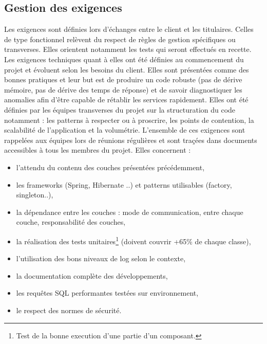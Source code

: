 \documentclass[12pt,a4paper]{article}
\begin{document}
\subsection{Gestion des exigences}
Les exigences sont définies lors d'échanges entre le client et les titulaires. Celles de type fonctionnel relèvent du respect de règles de gestion spécifiques ou transverses. Elles orientent notamment les tests qui seront effectués en recette. Les exigences techniques quant à elles ont été définies au commencement du projet et évoluent selon les besoins du client. Elles sont présentées comme des bonnes pratiques et leur but est de produire un code robuste (pas de dérive mémoire, pas de dérive des temps de réponse) et de savoir diagnostiquer les anomalies  afin d'être capable de rétablir les services rapidement.
\smallbreak
Elles ont été définies par les équipes transverses du projet sur la structuration du code notamment : les patterns à respecter ou à proscrire, les points de contention, la scalabilité de l'application et la volumétrie. L'ensemble de ces exigences sont rappelées aux équipes lors de réunions régulières et sont traçées dans documents accessibles à tous les membres du projet.
\smallbreak
Elles concernent :
\smallbreak
\begin{itemize}	
\item l'attendu du contenu des couches présentées précédemment,
\item les frameworks (Spring, Hibernate ..) et patterns utilisables (factory, singleton..),
\item la dépendance entre les couches : mode de communication, entre chaque couche, responsabilité des couches,
\item la réalisation des tests unitaires\footnote{Test de la bonne execution d'une partie d'un composant.} (doivent couvrir +65\% de chaque classe),
\item l'utilisation des bons niveaux de log selon le contexte,
\item la documentation complète des développements,
\item les requêtes \gls{SQL} performantes testées sur environnement,
\item le respect des normes de sécurité.
\end{itemize}
\medbreak
\end{document}
